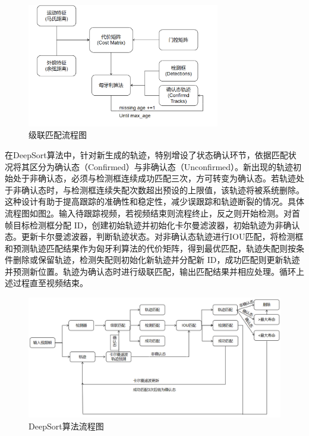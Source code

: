 \begin{figure}[htbp] %
	\centering
	\includegraphics[width=0.75\textwidth]{np3} %
	\caption{级联匹配流程图} %
	\label{fig:np3} %
\end{figure}



在DeepSort算法中，针对新生成的轨迹，特别增设了状态确认环节，依据匹配状况将其区分为确认态（Confirmed）与非确认态（Unconfirmed）。新出现的轨迹初始处于非确认态，必须与检测框连续成功匹配三次，方可转变为确认态。若轨迹处于非确认态时，与检测框连续失配次数超出预设的上限值，该轨迹将被系统删除。这种设计有助于提高跟踪的准确性和稳定性，减少误跟踪和轨迹断裂的情况。具体流程图如图\ref{fig:np4}。输入待跟踪视频，若视频结束则流程终止，反之则开始检测。对首帧目标检测框分配 ID，创建初始轨迹并初始化卡尔曼滤波器，初始轨迹为非确认态。更新卡尔曼滤波器，判断轨迹状态。对非确认态轨迹进行IOU匹配，将检测框和预测轨迹匹配结果作为匈牙利算法的代价矩阵，得到最优匹配，轨迹失配则按条件删除或保留轨迹，检测失配则初始化新轨迹并分配新 ID，成功匹配则更新轨迹并预测新位置。轨迹为确认态时进行级联匹配，输出匹配结果并相应处理。循环上述过程直至视频结束。


\begin{figure}[htbp] %
	\centering
	\includegraphics[width=1\textwidth]{np4} %
	\caption{DeepSort算法流程图} %
	\label{fig:np4} %
\end{figure}





